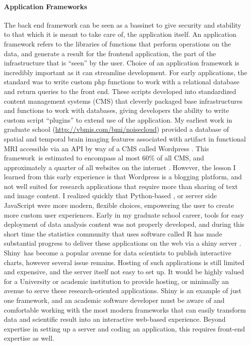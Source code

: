 \documentclass{report}
\begin{document}
\paragraph{Application Frameworks}
The back end framework can be seen as a bassinet to give security and
stability to that which it is meant to take care of, the application
itself. An application framework refers to the libraries of functions
that perform operations on the data, and generate a result for the
frontend application, the part of the infrastructure that is ``seen'' by
the user. Choice of an application framework is incredibly important as
it can streamline development. For early applications, the standard was
to write custom php \cite{noauthor_undated-kz} functions
to work with a relational database and return queries to the front end.
These scripts developed into standardized content management systems
(CMS) that cleverly packaged base infrastructures and functions to work
with databases, giving developers the ability to write custom script
``plugins'' to extend use of the application. My earliest work in
graduate school
(\href{http://vbmis.com/bmi/noisecloud}{http://vbmis.com/bmi/noisecloud})
provided a database of spatial and temporal brain imaging features
associated with artifact in functional MRI accessible via an API by way
of a CMS called Wordpress \cite{noauthor_undated-gm}.
This framework~is estimated to encompass al most 60\% of all CMS, and
approximately a quarter of all websites on the internet \cite{noauthor_undated-gm}.
However, the lesson I learned from this early experience is that
Wordpress is a blogging platform, and not well suited for research
applications that require more than sharing of text and image content. I
realized quickly that Python-based \cite{noauthor_undated-ia,noauthor_undated-ej},
or server side JavaScript \cite{Foundation-jqueryorg_undated-ra} were
more modern, flexible choices, empowering the user to create more custom
user experiences. Early in my graduate school career, tools for easy
deployment of data analysis content was not properly developed, and
during this short time the statistics community that uses software
called R has made substantial progress to deliver these applications on
the web via a shiny server \cite{noauthor_undated-sj}.
Shiny~has become a popular avenue for data scientists to publish
interactive charts, however several issue remains. Hosting of such
applications is still limited \cite{noauthor_undated-gd} and
expensive, and the server itself not easy to set up. It would be highly
valued for a University or academic institution to provide hosting, or
minimally an avenue to serve these research-oriented applications. Shiny
is an example of just one framework, and an academic software developer
must be aware of and comfortable working with the most modern frameworks
that can easily transform data and scientific result into an interactive
web-based experience. Beyond expertise in setting up a server and coding
an application, this requires front-end expertise as well.
\end{document}
